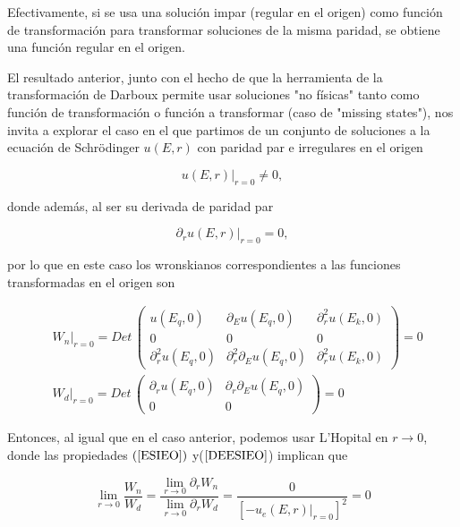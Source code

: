 Efectivamente, si se usa una solución impar (regular en el origen) como función de transformación para transformar soluciones de la misma paridad, se obtiene una función regular en el origen. 

El resultado anterior, junto con el hecho de que la herramienta de la transformación de Darboux permite usar soluciones "no físicas" tanto como función de transformación o función a transformar (caso de "missing states"), nos invita a explorar el caso en el que partimos de un conjunto de soluciones a la ecuación de Schrödinger $u(E,r)$ con paridad par e irregulares en el origen

\begin{equation*}
u(E,r)|_{r=0} \ne 0,
\end{equation*}

donde además, al ser su derivada de paridad par 

\begin{equation*}
\partial_r u(E,r)|_{r=0} = 0,
\end{equation*}

por lo que en este caso los wronskianos correspondientes a las funciones transformadas en el origen son

\begin{eqnarray*}
	& W_n |_{r=0}= Det\, 
	\begin{pmatrix}
		u(E_q,0) & \partial_E u(E_q,0) & \partial^2_r u(E_k,0)
		\\
		0 & 0 & 0
		\\
		\partial^2_r u(E_q,0) & \partial^2_r \partial_E u(E_q,0) & \partial^2_r u(E_k,0)
		
	\end{pmatrix} = 0
	\\[0.4cm]
	& W_d |_{r=0}= Det\, 
	\begin{pmatrix}
		\partial_r u(E_q,0) & \partial_r \partial_E u(E_q,0)
		\\
		0 & 0
	\end{pmatrix} = 0
\end{eqnarray*}

Entonces, al igual que en el caso anterior, podemos usar L'Hopital en $r \rightarrow 0$, donde las propiedades $(\ref{ESIEO})$ y($\ref{DEESIEO}$) implican que

\begin{equation*}
\lim_{r \to 0} \frac{W_n}{W_d} = \frac{\lim_{r \to 0} \partial_r W_n}{\lim_{r \to 0} \partial_r W_d} = \frac{0}{[-u_e(E,r)|_{r=0}]^2} = 0
\end{equation*}

